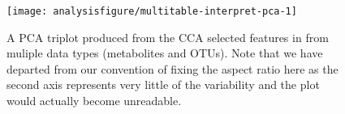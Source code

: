 \begin{figure}[H]
\begin{knitrout}
{\centering \texttt{[image: analysisfigure/multitable-interpret-pca-1]} 

}



\end{knitrout}
\caption{A PCA triplot produced from the CCA selected features in from muliple data types (metabolites and OTUs).
Note that we have departed from our convention of fixing the aspect ratio here as the second axis
represents very little of the variability and the plot would actually become unreadable.}
\label{fig:multitable-interpret-pca}
\end{figure}
